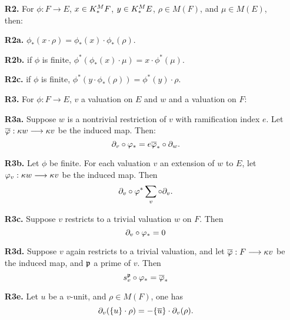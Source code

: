 \begin{definition}
\begin{enumerate}
\item[\textbf{R2.}] For $\phi: F \to E$, $x \in K^M_*F$, $y \in
K^M_*E$, $\rho \in M(F)$, and $\mu \in M(E)$, then:

\item[\textbf{R2a.}] $\phi_*(x \cdot \rho) = \phi_*(x) \cdot 
\phi_*(\rho)$.

\item[\textbf{R2b.}] if $\phi$ is finite, $\phi^*(\phi_*(x) \cdot 
\mu) = x \cdot \phi^*(\mu)$.

\item[\textbf{R2c.}] if $\phi$ is finite, $\phi^*(y \cdot 
\phi_*(\rho)) = \phi^*(y) \cdot \rho$.

\item[\textbf{R3.}] For $\phi: F \to E$, $v$ a valuation on $E$
and $w$ and a valuation on $F$:

\item[\textbf{R3a.}] Suppose $w$ is a nontrivial restriction of 
$v$ with ramification index $e$. Let $\overline{\varphi}: \kappa{w} \longrightarrow 
\kappa{v}$ be the induced map. Then:
\[
\partial_{v} \circ \varphi_* = e \overline{\varphi}_* \circ \partial_{w}.
\]

\item[\textbf{R3b.}] Let $\phi$ be finite. For each valuation $v$ 
an extension of $w$ to $E$, let $\varphi_v: \kappa{w} \longrightarrow \kappa{v}$
be the induced map. Then
\[
\partial_{v} \circ \varphi^* \sum_{v} \circ \partial_{v}.
\]

\item[\textbf{R3c.}] Suppose $v$ restricts to a trivial valuation
$w$ on $F$. Then
\[
\partial_{v} \circ \varphi_* = 0
\]

\item[\textbf{R3d.}] Suppose $v$ again restricts to a trivial 
valuation, and let $\overline{\varphi}: F \longrightarrow \kappa{v}$ be the induced map, and
$\mathfrak{p}$ a prime of $v$. Then
\[
s_{v}^{\mathfrak{p}} \circ \varphi_* = \overline{\varphi}_*
\]

\item[\textbf{R3e.}] Let $u$ be a $v$-unit, and $\rho \in M(F)$,
one has
\[
\partial_{v}(\{u\} \cdot \rho) = -\{\overline{u}\} \cdot \partial_{v}(\rho).
\]
\end{enumerate}
\end{definition}

